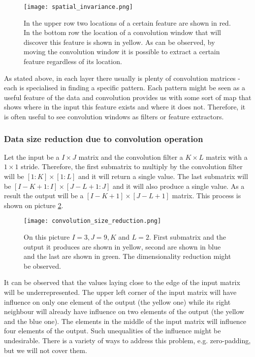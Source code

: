 \documentclass[a4paper,10pt]{report}
\begin{document}
	  \begin{figure}[h!]
	    \centering
	    \texttt{[image: spatial\_invariance.png]}
	    \caption{In the upper row two locations of a certain feature are shown in red. In the bottom row the location of a convolution window that will discover this feature is shown in yellow. As can be observed, by moving the convolution window it is possible to extract a certain feature regardless of its location.}
	    \label{fig:spatial_invariance}
	  \end{figure} 
	  
	  
	  As stated above, in each layer there usually is plenty of convolution matrices - each is specialised in finding a specific pattern. Each pattern might be seen as a useful feature of the data and convolution provides us with some sort of map that shows where in the input this feature exists and where it does not. Therefore, it is often useful to see convolution windows as filters or feature extractors.\\
	  
	  \subsubsection{Data size reduction due to convolution operation}
	  
 	  Let the input be a $I\times J$ matrix and the convolution filter a $K\times L$ matrix with a $1\times1$ stride. Therefore, the first submatrix to multiply by the convolution filter will be $[1:K]\times[1:L]$ and it will return a single value. The last submatrix will be $[I-K+1:I]\times[J-L+1:J]$ and it will also produce a  single value. As a result the output will be a $[I-K+1]\times[J-L+1]$ matrix. This process is shown on picture \ref{fig:convolution_size_reduction}.\\
	  
	  
	  \begin{figure}[h!]
	    \centering
	    \texttt{[image: convolution\_size\_reduction.png]}
	    \caption{On this picture $I = 3, J = 9, K$ and $L = 2$. First submatrix and the output it produces are shown in yellow, second are shown in blue and the last are shown in green. The dimensionality reduction might be observed.}
	    \label{fig:convolution_size_reduction}
	  \end{figure} 
	  
	  It can be observed that the values laying close to the edge of the input matrix will be underrepresented. The upper left corner of the input matrix will have influence on only one element of the output (the yellow one) while its right neighbour will already have influence on two elements of the output (the yellow and the blue one). The elements in the middle of the input matrix will influence four elements of the output. Such unequalities of the influence might be undesirable. There is a variety of ways to address this problem, e.g. zero-padding, but we will not cover them.\\
	  
\end{document}
